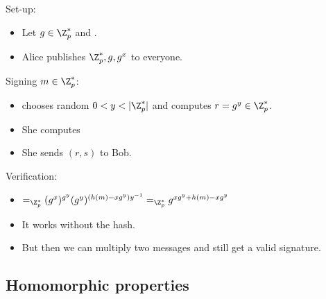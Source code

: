 \begin{frame}
  \begin{definition}
    Set-up:
    \begin{itemize}
      \item Let \(g\in \Z_p^*\) and .
      \item Alice publishes \(\Z_p^*, g, g^x\) to everyone.
    \end{itemize}
    Signing \(m\in \Z_p^*\):
    \begin{itemize}
      \item {} chooses random \(0 < y < |\Z_p^*|\) and computes 
        \(r = g^y\in \Z_p^*\).
      \item She computes 
      \item She sends \((r, s)\) to Bob.
    \end{itemize}
    Verification:
    \begin{itemize}
      \item {}\( =_{\Z_p^*}
          (g^x)^{g^y} (g^y)^{(h(m) - xg^y)y^{-1}} =_{\Z_p^*}
          g^{xg^y + h(m) - xg^y}\)
    \end{itemize}
  \end{definition}
\end{frame}

\begin{frame}
  \begin{remark}
    \begin{itemize}
      \item It works without the hash.
      \item But then we can multiply two messages and still get a valid 
        signature.
    \end{itemize}
  \end{remark}
\end{frame}

\subsection{Homomorphic properties}

